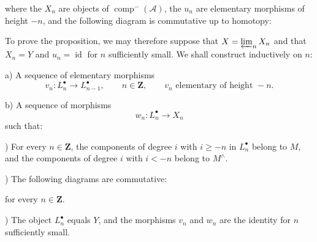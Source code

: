 \clearpage
{}%
\begingroup\small\setlength{\parskip}{0pt}\setlength{\emergencystretch}{1.5em}
\setlength{\abovedisplayskip}{4pt plus 2pt minus 2pt}%
\setlength{\belowdisplayskip}{4pt plus 2pt minus 2pt}%

where the $X_n$ are objects of $\operatorname{comp}^{-}(\mathcal A)$,
the $u_n$ are elementary morphisms of height $-n$, and the following
diagram is commutative up to homotopy:

\begin{center}
\end{center}

To prove the proposition, we may therefore suppose that
$X=\varprojlim_n X_n$ and that $X_n=Y$ and
$u_n=\operatorname{id}$ for $n$ sufficiently small. We shall construct
inductively on $n$:

\noindent a) A sequence of elementary morphisms
\[
v_n\colon L_n^\bullet\longrightarrow L_{n-1}^\bullet,
\qquad n\in\mathbf Z,\qquad
v_n\text{ elementary of height }-n.
\]

\noindent b) A sequence of morphisms
\[
w_n\colon L_n^\bullet\longrightarrow X_n
\]
such that:

) For every $n\in\mathbf Z$, the components of degree $i$ with
$i\geq -n$ in $L_n^\bullet$ belong to $M$, and the components of degree $i$
with $i<-n$ belong to $M^\wedge$.

) The following diagrams are commutative:
\begin{center}
\end{center}
for every $n\in\mathbf Z$.

) The object $L_n^\bullet$ equals $Y$, and the morphisms $v_n$
and $w_n$ are the identity for $n$ sufficiently small.
\endgroup
